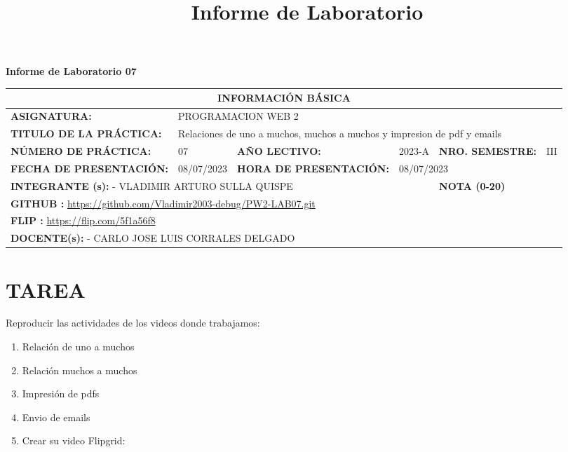 \documentclass{article}
\title{Informe de Laboratorio}
\newcommand{\itemStudent}{VLADIMIR ARTURO SULLA QUISPE}
\newcommand{\itemTeacher}{CARLO JOSE LUIS CORRALES DELGADO}
\newcommand{\itemGitHubURL}{https://github.com/Vladimir2003-debug/PW2-LAB07.git}
\newcommand{\itemCourse}{PROGRAMACION WEB 2}
\newcommand{\itemSemester}{III}
\newcommand{\itemPracticeNumber}{07}
\newcommand{\itemTheme}{Relaciones de uno a muchos, muchos a muchos y impresion de pdf y emails}
\newcommand{\itemFlip}{https://flip.com/5f1a56f8}
\newcommand{\itemInput}{08/07/2023}
\newcommand{\itemOutput}{08/07/2023}
\begin{document}
\vspace*{30px}

\begin{center}	
		\fontsize{17}{17} \textbf{ Informe de Laboratorio \itemPracticeNumber}
\end{center}
 
\renewcommand{\arraystretch}{1.5}

\begin{tabular}{ |m{3cm}|m{2cm}|m{3cm}|m{1.2cm}|m{2.5cm}|m{1cm}| }
    \hline
    
    \multicolumn{6}{|c|}{\cellcolor{red}\textbf{INFORMACIÓN BÁSICA}} \\
    \hline
    \textbf{ASIGNATURA:} & \multicolumn{5}{|l|}{ \itemCourse} \\
    \hline
    \textbf{TITULO DE LA PRÁCTICA:} & \multicolumn{5}{|l|}{\itemTheme} \\
    \hline     
    \textbf{NÚMERO DE PRÁCTICA:} & \itemPracticeNumber & \textbf{AÑO LECTIVO:} & 2023-A & \textbf{NRO. SEMESTRE:} & \itemSemester\\
    \hline     
    \textbf{FECHA DE PRESENTACIÓN: } & \itemInput & \textbf{HORA DE PRESENTACIÓN:} & \multicolumn{3}{|l|}{ \itemOutput } \\
    \hline     
    \multicolumn{4}{|l|}{\textbf{INTEGRANTE (s):}
    - \itemStudent 
    } &  \textbf{NOTA (0-20)} & \\
    \hline
    \multicolumn{6}{|l|}{\textbf{GITHUB :} \url{\itemGitHubURL}} \\
    \hline
    \multicolumn{6}{|l|}{\textbf{FLIP :} \url{\itemFlip}} \\
    \hline
    \multicolumn{6}{|l|}{\textbf{DOCENTE(s): }
    - \itemTeacher 
    } \\
    \hline     
\end{tabular}

\tableofcontents

\section{TAREA}

Reproducir las actividades de los videos donde trabajamos:

\begin{enumerate}
    \item Relación de uno a muchos
    \item Relación muchos a muchos
    \item Impresión de pdfs 
    \item Envio de emails
    \item Crear su video Flipgrid:
\end{enumerate}
\end{document}
